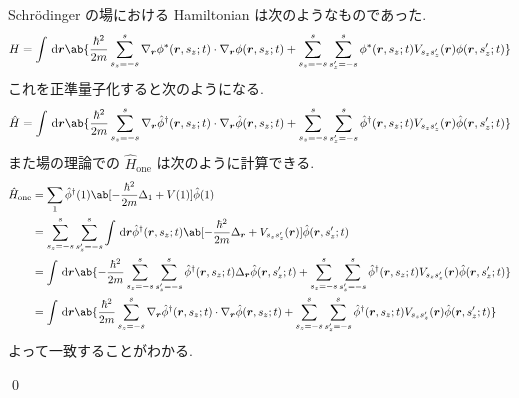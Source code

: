 \documentclass[uplatex,dvipdfmx,a4paper,11pt]{jlreq}
\makeatletter
\newcommand{\rr}{\bm{r}}
\numberwithin{equation}{section}
\theoremstyle{definition}
\renewenvironment{proof}[1][\proofname]{\par
  \normalfont
  \topsep6\p@\@plus6\p@ \trivlist
  \item[\hskip\labelsep{\bfseries #1}\@addpunct{\bfseries}]\ignorespaces\quad\par
}{
  \qed\endtrivlist\@endpefalse
}
\renewcommand\proofname{証明}
\makeatother
\begin{document}
\begin{proof}
  Schrödinger の場における Hamiltonian は次のようなものであった.
  \begin{align}
    H = \int\dl{\rr}\ab\{\frac{\hbar^2}{2m}\sum_{s_z = -s}^{s}\nabla_{\rr}\phi^*(\rr, s_z; t)\cdot\nabla_{\rr}\phi(\rr, s_z; t) + \sum_{s_z = -s}^{s}\sum_{s_z' = -s}^{s}\phi^*(\rr, s_z; t)V_{s_zs_z'}(\rr)\phi(\rr, s_z'; t)\}
  \end{align}
  これを正準量子化すると次のようになる.
  \begin{align}
    \hat{H} = \int\dl{\rr}\ab\{\frac{\hbar^2}{2m}\sum_{s_z = -s}^{s}\nabla_{\rr}\hat{\phi}^\dagger(\rr, s_z; t)\cdot\nabla_{\rr}\hat{\phi}(\rr, s_z; t) + \sum_{s_z = -s}^{s}\sum_{s_z' = -s}^{s}\hat{\phi}^\dagger(\rr, s_z; t)V_{s_zs_z'}(\rr)\hat{\phi}(\rr, s_z'; t)\}
  \end{align}
  また場の理論での $\hat{H}_{\mathrm{one}}$ は次のように計算できる.
  \begin{align}
    \hat{H}_{\mathrm{one}} & = \sum_{1}\hat{\phi}^\dagger(1)\ab[-\frac{\hbar^2}{2m}\Delta_{1} + V(1)]\hat{\phi}(1)                                                                                                                                                                               \\
                           & = \sum_{s_z = -s}^{s}\sum_{s_z' = -s}^{s}\int\dl{\rr}\hat{\phi}^\dagger(\rr, s_z; t)\ab[-\frac{\hbar^2}{2m}\Delta_{\rr} + V_{s_zs_z'}(\rr)]\hat{\phi}(\rr, s_z'; t)                                                                                                 \\
                           & = \int\dl{\rr}\ab\{-\frac{\hbar^2}{2m}\sum_{s_z = -s}^{s}\sum_{s_z' = -s}^{s}\hat{\phi}^\dagger(\rr, s_z; t)\Delta_{\rr}\hat{\phi}(\rr, s_z'; t) + \sum_{s_z = -s}^{s}\sum_{s_z' = -s}^{s}\hat{\phi}^\dagger(\rr, s_z; t)V_{s_zs_z'}(\rr)\hat{\phi}(\rr, s_z'; t)\} \\
                           & = \int\dl{\rr}\ab\{\frac{\hbar^2}{2m}\sum_{s_z = -s}^{s}\nabla_{\rr}\hat{\phi}^\dagger(\rr, s_z; t)\cdot\nabla_{\rr}\hat{\phi}(\rr, s_z; t) + \sum_{s_z = -s}^{s}\sum_{s_z' = -s}^{s}\hat{\phi}^\dagger(\rr, s_z; t)V_{s_zs_z'}(\rr)\hat{\phi}(\rr, s_z'; t)\}
  \end{align}
  よって一致することがわかる.
\end{proof}
\end{document}
